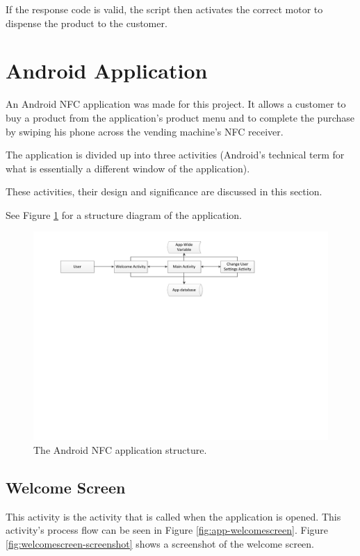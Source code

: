 If the response code is valid, the script then activates the correct motor to
dispense the product to the customer.

\section{Android Application}
\label{sec:nfc-android-app}

An Android NFC application was made for this project. It allows a customer to buy a
product from the application's product menu and to complete the purchase by swiping
his phone across the vending machine's NFC receiver.

The application is divided up into three activities (Android's technical term for what
is essentially a different window of the application). 

These activities, their design and significance are discussed in this section.

See Figure \ref{fig:nfc_app_structure} for a structure
diagram of the application.

\begin{figure}
 \centering 
 \includegraphics[clip = true, trim = 40 400 0 20,
 scale=0.7]{app_structure}
 \caption{The Android NFC application structure.}
 \label{fig:nfc_app_structure}
\end{figure}

\subsection{Welcome Screen}

This activity is the activity that is called when the application is opened. This
activity's process flow can be seen in Figure \ref{fig:app-welcomescreen}.
Figure \ref{fig:welcomescreen-screenshot} shows a screenshot of the welcome
screen.

